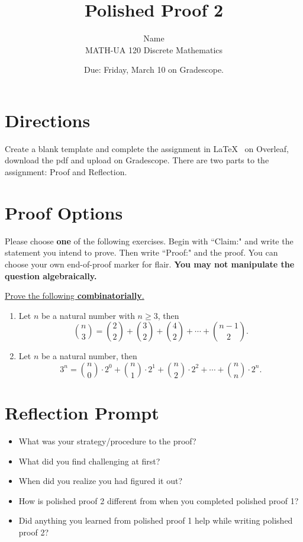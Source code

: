 \documentclass{article}
\title{Polished Proof 2}
\author{%
	Name
	\\
	MATH-UA 120 Discrete Mathematics
}
\date{Due: Friday, March 10 on Gradescope.}
\theoremstyle{definition}
\begin{document}
    \maketitle
	
\section*{Directions}
    Create a blank template and complete the assignment in \LaTeX~  on Overleaf, 
    download the pdf and upload on Gradescope. There are two parts to the assignment: Proof and Reflection.

\section*{Proof Options}
    Please choose \textbf{one} of the following exercises. Begin with ``Claim:" and write the statement you intend to prove. 
    Then write ``Proof:" and the proof. You can choose your own end-of-proof marker for flair. \textbf{You may not manipulate the question algebraically.}
    
    \underline{Prove the following {\bf combinatorially}.}
    \begin{enumerate}
	\item Let $n$ be a natural number with $n\geq 3$, then
         \[
         \binom{n}{3} = \binom{2}{2} + \binom{3}{2} + \binom{4}{2} + \cdots + \binom{n-1}{2}.
         \]
	\item Let $n$ be a natural number, then
        \[
        3^n = \binom{n}{0} \cdot 2^0 + \binom{n}{1}\cdot 2^1+ \binom{n}{2}\cdot 2^2+\cdots +\binom{n}{n}\cdot 2^n.
        \]
    \end{enumerate}

\section*{Reflection Prompt}
    \begin{itemize}
        \item What was your strategy/procedure to the proof?
        \item What did you find challenging at first?
        \item When did you realize you had figured it out?
        \item How is polished proof 2 different from when you completed polished proof 1?
        \item Did anything you learned from polished proof 1 help while writing polished proof 2?
    \end{itemize}
\end{document}
